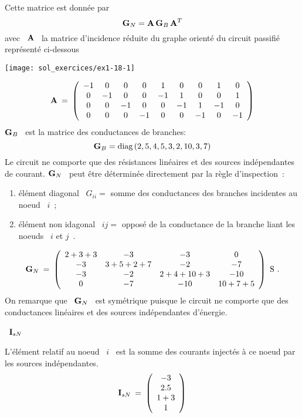 Cette matrice est donnée par
\[ {\bf G}_N = {\bf A} \, {\bf G}_B \, {\bf A}^T \]
avec \ ${\bf A}$ \ la matrice d'incidence réduite du graphe orienté du
circuit passifié représenté ci-dessous
\begin{center}
	\texttt{[image: sol\_exercices/ex1-18-1]}
\end{center}
\[ {\bf A} \: = \: \left( \begin{array}{ccccccccc}
-1 & 0 & 0 & 0 & 1 & 0 & 0 & 1 & 0\\
0 & -1 & 0 & 0 & -1 & 1 & 0 & 0 & 1\\
0 & 0 & -1 & 0 & 0 & -1 & 1 & -1 & 0\\
0 & 0 & 0 & -1 & 0 & 0 & -1 & 0 & -1
\end{array} \right) \]
${\bf G}_B$ \ est la matrice des conductances de branches:
\[{\bf G}_B = \mbox{diag} \, (2,5,4,5,3,2,10,3,7)\]
Le circuit ne comporte que des résistances linéaires et des sources indépendantes de courant.
${\bf G}_N$ \ peut être déterminée directement par la règle d'inspection~:
\begin{enumerate}
	\item \'el\'ement diagonal \ $G_{ii} =$ somme des conductances des
	branches incidentes au noeud \ $i$~;
	\item élément non idagonal \ $ij =$ opposé de la conductance de la
	branche liant les noeuds \ $i$ et $j$~.
\end{enumerate}
\[ {\bf G}_N \: = \: \left( \begin{array}{cccc}
2+3+3 & -3 & -3 & 0\\
-3 & 3+5+2+7 & -2 & -7\\
-3 & -2 & 2+4+10+3 & -10\\
0 & -7 & -10 & 10+7+5
\end{array} \right)~\text{S}~. \]
On remarque que \ ${\bf G}_N$ \ est symétrique puisque le circuit ne
comporte que des conductances linéaires et des sources indépendantes
d'énergie.

 \ ${\bf I}_{sN}$

L'élément relatif au noeud \ $i$ \ est la somme des courants injectés
à ce noeud par les sources indépendantes.
\[ {\bf I}_{sN} \: = \: \left( \begin{array}{c}
-3 \\ 2.5 \\ 1+3 \\ 1
\end{array} \right)  \]

